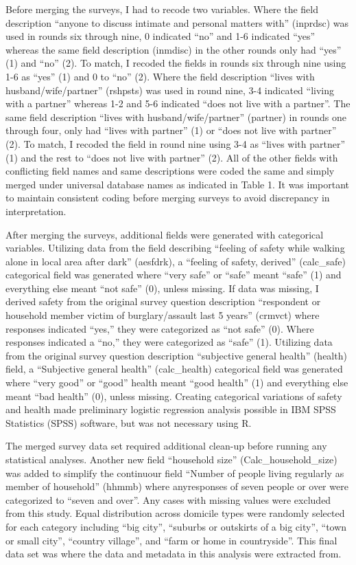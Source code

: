 Before merging the surveys, I had to recode two variables. Where the
field description ``anyone to discuss intimate and personal matters
with'' (inprdsc) was used in rounds six through nine, 0 indicated ``no''
and 1-6 indicated ``yes'' whereas the same field description (inmdisc)
in the other rounds only had ``yes'' (1) and ``no'' (2). To match, I
recoded the fields in rounds six through nine using 1-6 as ``yes'' (1)
and 0 to ``no'' (2). Where the field description ``lives with
husband/wife/partner'' (rshpsts) was used in round nine, 3-4 indicated
``living with a partner'' whereas 1-2 and 5-6 indicated ``does not live
with a partner''. The same field description ``lives with
husband/wife/partner'' (partner) in rounds one through four, only had
``lives with partner'' (1) or ``does not live with partner'' (2). To
match, I recoded the field in round nine using 3-4 as ``lives with
partner'' (1) and the rest to ``does not live with partner'' (2). All of
the other fields with conflicting field names and same descriptions were
coded the same and simply merged under universal database names as
indicated in Table 1. It was important to maintain consistent coding
before merging surveys to avoid discrepancy in interpretation.

After merging the surveys, additional fields were generated with
categorical variables. Utilizing data from the field describing
``feeling of safety while walking alone in local area after dark''
(aesfdrk), a ``feeling of safety, derived'' (calc\_safe) categorical
field was generated where ``very safe'' or ``safe'' meant ``safe'' (1)
and everything else meant ``not safe'' (0), unless missing. If data was
missing, I derived safety from the original survey question description
``respondent or household member victim of burglary/assault last 5
years'' (crmvct) where responses indicated ``yes,'' they were
categorized as ``not safe'' (0). Where responses indicated a ``no,''
they were categorized as ``safe'' (1). Utilizing data from the original
survey question description ``subjective general health'' (health)
field, a ``Subjective general health'' (calc\_health) categorical field
was generated where ``very good'' or ``good'' health meant ``good
health'' (1) and everything else meant ``bad health'' (0), unless
missing. Creating categorical variations of safety and health made
preliminary logistic regression analysis possible in IBM SPSS Statistics
(SPSS) software, but was not necessary using R.

The merged survey data set required additional clean-up before running
any statistical analyses. Another new field ``household size''
(Calc\_household\_size) was added to simplify the continuour field
``Number of people living regularly as member of household'' (hhmmb)
where anyresponses of seven people or over were categorized to ``seven
and over''. Any cases with missing values were excluded from this study.
Equal distribution across domicile types were randomly selected for each
category including ``big city'', ``suburbs or outskirts of a big city'',
``town or small city'', ``country village'', and ``farm or home in
countryside''. This final data set was where the data and metadata in
this analysis were extracted from.

